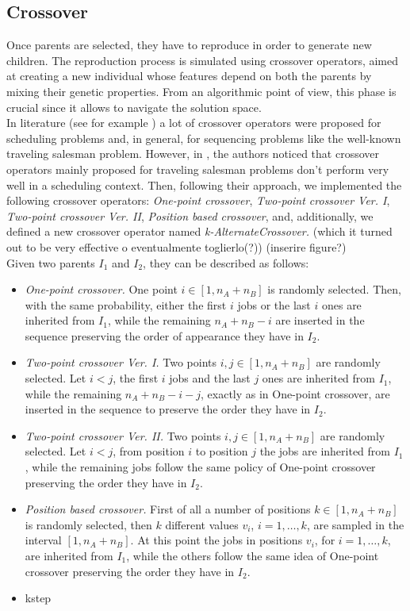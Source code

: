 \documentclass[opre,nonblindrev]{informs3} %
\begin{document}
\subsection{Crossover}
Once parents are selected, they have to reproduce in order to generate new children. The reproduction process is simulated using crossover operators, aimed at creating a new individual whose features depend on both the parents by mixing their genetic properties. From an algorithmic point of view, this phase is crucial since it allows to navigate the solution space. \\
In literature (see for example \cite{cross1}) a lot of crossover operators were proposed for scheduling problems and, in general, for sequencing problems like the well-known traveling salesman problem. However, in \cite{sched1}, the authors noticed that crossover operators mainly proposed for traveling salesman problems don't perform very well in a scheduling context. Then, following their approach, we implemented the following crossover operators: \textit{One-point crossover}, \textit{Two-point crossover Ver. I}, \textit{Two-point crossover Ver. II}, \textit{Position based crossover}, and, additionally, we defined a new crossover operator named \textit{k-AlternateCrossover.} (which it turned out to be very effective o eventualmente toglierlo(?)) (inserire figure?)\\
Given two parents $I_1$ and $I_2$, they can be described as follows: 
\begin{itemize}
	\item \textit{One-point crossover.} One point $i \in [1,n_A+n_B]$ is randomly selected. Then, with the same probability, either the first $i$ jobs or the last $i$ ones are inherited from $I_1$, while the remaining $n_A+n_B-i$ are inserted in the sequence preserving the order of appearance they have in $I_2$. 
	\item \textit{Two-point crossover Ver. I.} Two points $i,j \in [1,n_A+n_B]$ are randomly selected. Let $i < j$, the first $i$ jobs and the last $j$ ones are inherited from $I_1$, while the remaining $n_A+n_B-i-j$, exactly as in One-point crossover, are inserted in the sequence to preserve the order they have in $I_2$.
	\item \textit{Two-point crossover Ver. II.} Two points $i,j \in [1,n_A+n_B]$ are randomly selected. Let $i < j$, from position $i$ to position $j$ the jobs are inherited from $I_1$, while the remaining jobs follow the same policy of One-point crossover preserving the order they have in $I_2$.
	\item \textit{Position based crossover.} First of all a number of positions $k \in [1,n_A+n_B]$ is randomly selected, then $k$ different values $v_i$, $i=1,\ldots,k$, are sampled in the interval $[1,n_A+n_B].$ At this point the jobs in positions $v_i$, for $i=1,\ldots,k$, are inherited from $I_1$, while the others follow the same idea of One-point crossover preserving the order they have in $I_2$.
	\item kstep
\end{itemize}
\end{document}

